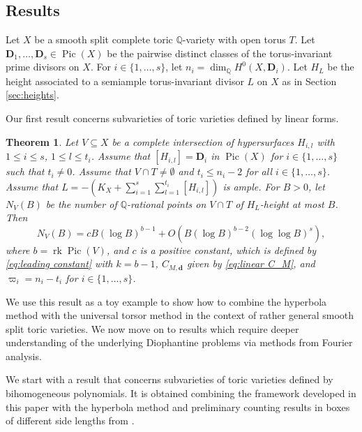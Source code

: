 \documentclass[10pt, a4paper, reqno, english]{amsart}
\newcommand\QQ{\mathbb{Q}}
\newcommand{\divclass}{{\mathbf D}} %
\DeclareMathOperator{\pic}{Pic} %
\DeclareMathOperator{\rk}{rk} %
\newtheorem{theorem}{Theorem}
\theoremstyle{definition}
\numberwithin{theorem}{section}
\numberwithin{equation}{section}
\begin{document}
\subsection{Results}
Let $X$ be a smooth split complete toric $\QQ$-variety with open torus $T$. Let $\divclass_1,\dots, \divclass_s\in\pic(X)$ be the pairwise distinct classes of the torus-invariant prime divisors on $X$. For $i\in\{1,\dots,s\}$, let $n_i=\dim_\QQ H^0(X,\divclass_i)$. Let $H_L$ be the height associated to a semiample torus-invariant divisor $L$ on $X$ as in Section \ref{sec:heights}. 

Our first result concerns subvarieties of toric varieties defined by linear forms.

\begin{theorem}\label{thm:linear}
Let $V\subseteq X$ be a complete intersection of hypersurfaces $H_{i,l}$ with $1\leq i\leq s$, $1\leq l\leq t_i$. Assume that $[H_{i,l}]=\divclass_i$ in $\pic(X)$ for $i\in\{1,\dots,s\}$ such that $t_i\neq 0$. Assume that $V\cap T\neq\emptyset$ and $t_i\leq n_i-2$ for all $i\in\{1,\dots,s\}$. 
Assume that $L=-(K_X+\sum_{i=1}^s\sum_{l=1}^{t_i}[H_{i,l}])$ is ample.
For $B>0$, let $N_V(B)$ be the number of $\QQ$-rational points on $V\cap T$ of $H_L$-height at most $B$. Then 
$$
N_V(B)=cB(\log B)^{b-1} +O(B(\log B)^{b-2}(\log\log B)^s),
$$
where $b=\rk\pic(V)$, and $c$ is a positive constant, which is defined by \eqref{eq:leading constant} with $k=b-1$, $C_{M,\mathbf d}$ given by \eqref{eq:linear C_M}, and $\varpi_i=n_i-t_i$ for $i\in\{1,\dots,s\}$.
\end{theorem}

We use this result as a toy example to show how to combine the hyperbola method with the universal torsor method in the context of rather general smooth split toric varieties. We now move on to results which require deeper understanding of the underlying Diophantine problems via methods from Fourier analysis.

We start with a result that concerns subvarieties of toric varieties defined by bihomogeneous polynomials. It is obtained combining the framework developed in this paper with the hyperbola method \cite{hypmethod} and preliminary counting results in boxes of different side lengths from \cite{Sch}.
\end{document}
